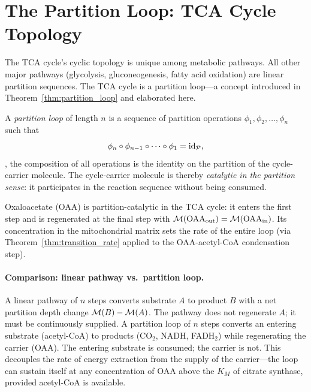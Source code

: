 \section{The Partition Loop: TCA Cycle Topology}
\label{sec:partition_loop}

The TCA cycle's cyclic topology is unique among metabolic pathways. All other
major pathways (glycolysis, gluconeogenesis, fatty acid oxidation) are linear
partition sequences. The TCA cycle is a partition loop---a concept introduced
in Theorem~\ref{thm:partition_loop} and elaborated here.

\begin{definition}
\label{def:partition_loop}
A \emph{partition loop} of length $n$ is a sequence of partition operations
$\phi_1, \phi_2, \ldots, \phi_n$ such that
\begin{equation}
  \phi_n \circ \phi_{n-1} \circ \cdots \circ \phi_1 = \mathrm{id}_{\mathcal{P}},
  \label{eq:loop_identity}
\end{equation}
\ie, the composition of all operations is the identity on the partition of
the cycle-carrier molecule. The cycle-carrier molecule is thereby \emph{catalytic
in the partition sense}: it participates in the reaction sequence without
being consumed.
\end{definition}

\begin{corollary}
\label{cor:oaa_catalytic}
Oxaloacetate (OAA) is partition-catalytic in the TCA cycle:
it enters the first step and is regenerated at the final step with
$\mathcal{M}(\mathrm{OAA}_{\mathrm{out}}) = \mathcal{M}(\mathrm{OAA}_{\mathrm{in}})$.
Its concentration in the mitochondrial matrix sets the rate of the
entire loop (via Theorem~\ref{thm:transition_rate} applied to the
OAA-acetyl-CoA condensation step).
\end{corollary}

\paragraph{Comparison: linear pathway vs.\ partition loop.}
A linear pathway of $n$ steps converts substrate $A$ to product $B$ with
a net partition depth change $\mathcal{M}(B) - \mathcal{M}(A)$. The pathway does not
regenerate $A$; it must be continuously supplied. A partition loop of $n$
steps converts an entering substrate (acetyl-CoA) to products (CO$_2$,
NADH, FADH$_2$) while regenerating the carrier (OAA). The entering substrate
is consumed; the carrier is not. This decouples the rate of energy extraction
from the supply of the carrier---the loop can sustain itself at any concentration
of OAA above the $K_M$ of citrate synthase, provided acetyl-CoA is available.

